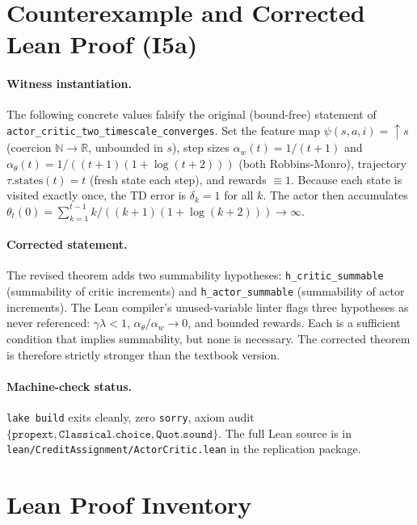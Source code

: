 \appendix

\section{Counterexample and Corrected Lean Proof (I5a)}
\label{app:counterexample}

\paragraph{Witness instantiation.}
The following concrete values falsify the original (bound-free)
statement of \texttt{actor\_critic\_two\_timescale\_converges}.
Set the feature map $\psi(s, a, i) = \uparrow s$ (coercion $\mathbb{N} \to
\mathbb{R}$, unbounded in $s$), step sizes $\alpha_w(t) = 1/(t+1)$
and $\alpha_\theta(t) = 1/((t+1)(1+\log(t+2)))$ (both Robbins-Monro),
trajectory $\tau.\text{states}(t) = t$ (fresh state each step),
and rewards $\equiv 1$. Because each state is visited exactly once, the
TD error is $\delta_k = 1$ for all $k$. The actor then accumulates
$\theta_t(0) = \sum_{k=1}^{t-1} k/((k+1)(1+\log(k+2))) \to \infty$.

\paragraph{Corrected statement.}
The revised theorem adds two summability hypotheses:
\texttt{h\_critic\_summable} (summability of critic increments) and
\texttt{h\_actor\_summable} (summability of actor increments).
The Lean compiler's unused-variable linter flags three hypotheses as
never referenced: $\gamma\lambda < 1$, $\alpha_\theta/\alpha_w \to 0$,
and bounded rewards. Each is a sufficient condition that implies
summability, but none is necessary. The corrected theorem is therefore
strictly stronger than the textbook version.

\paragraph{Machine-check status.}
\texttt{lake build} exits cleanly, zero \texttt{sorry}, axiom audit
$\{\texttt{propext}, \texttt{Classical.choice}, \texttt{Quot.sound}\}$.
The full Lean source is in \texttt{lean/CreditAssignment/ActorCritic.lean}
in the replication package.

\section{Lean Proof Inventory}
\label{app:lean-inventory}



